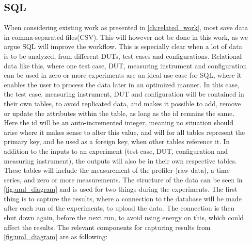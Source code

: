 \subsection{SQL}\label{subsec:sql}

When considering existing work as presented in \cref{ch:related_work}, most save data in comma-separated files(CSV)\cite*[]{Koedijk2022diff,Pereira2017}. This will however not be done in this work, as we argue SQL will improve the workflow. This is especially clear when a lot of data is to be analyzed, from different DUTs, test cases and configurations. Relational data like this, where one test case, DUT, measuring instrument and configuration can be used in zero or more experiments are an ideal use case for SQL, where it enables the user to process the data later in an optimized manner\cite*[]{Silberschatz2019}. In this case, the test case, measuring instrument, DUT and configuration will be contained in their own tables, to avoid replicated data, and makes it possible to add, remove or update the attributes within the table, as long as the id remains the same. Here the id will be an auto-incremented integer, meaning no situation should arise where it makes sense to alter this value, and will for all tables represent the primary key, and be used as a foreign key, when other tables reference it. In addition to the inputs to an experiment (test case, DUT, configuration and measuring instrument), the outputs will also be in their own respective tables. These tables will include the measurement of the profiler (raw data), a time series, and zero or more measurements. The structure of the data can be seen in \cref{fig:uml_diagram} and is used for two things during the experiments. The first thing is to capture the results, where a connection to the database will be made after each run of the experiments, to upload the data. The connection is then shut down again, before the next run, to avoid using energy on this, which could affect the results. The relevant components for capturing results from \cref{fig:uml_diagram} are as following:

